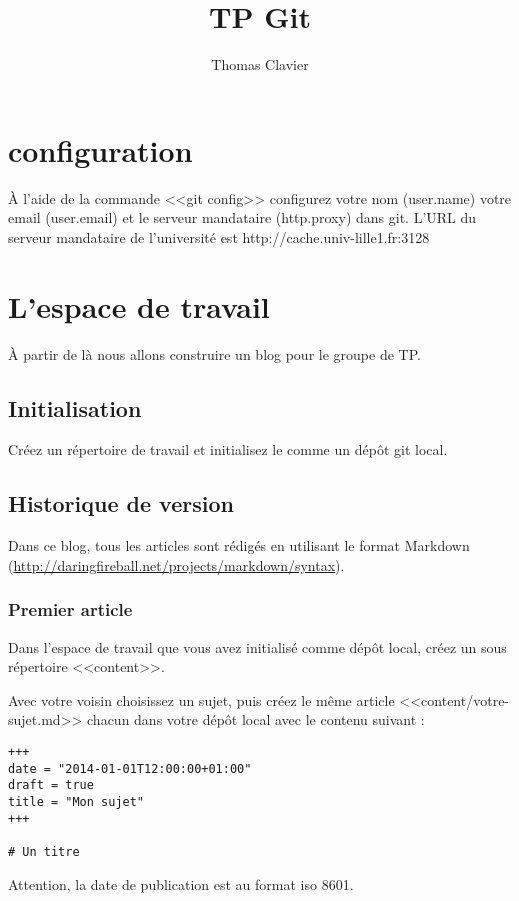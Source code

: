 \documentclass[a4paper]{article}
\title{TP Git}
\author{Thomas Clavier}
\date{}
\begin{document}
\maketitle

\section{configuration}

À l'aide de la commande <<git config>> configurez votre nom (user.name) votre email (user.email) et le serveur mandataire (http.proxy) dans git. L'URL du serveur mandataire de l'université est http://cache.univ-lille1.fr:3128

\section{L'espace de travail}

À partir de là nous allons construire un blog pour le groupe de TP.

\subsection{Initialisation}
Créez un répertoire de travail et initialisez le comme un dépôt git local.

\subsection{Historique de version}
Dans ce blog, tous les articles sont rédigés en utilisant le format Markdown (\url{http://daringfireball.net/projects/markdown/syntax}).

\subsubsection{Premier article}
Dans l'espace de travail que vous avez initialisé comme dépôt local, créez un sous répertoire <<content>>.

Avec votre voisin choisissez un sujet, puis créez le même article <<content/votre-sujet.md>> chacun dans votre dépôt local avec le contenu suivant : 

\begin{verbatim}
+++
date = "2014-01-01T12:00:00+01:00"
draft = true
title = "Mon sujet"
+++

# Un titre
\end{verbatim}

Attention, la date de publication est au format iso 8601.
\end{document}
